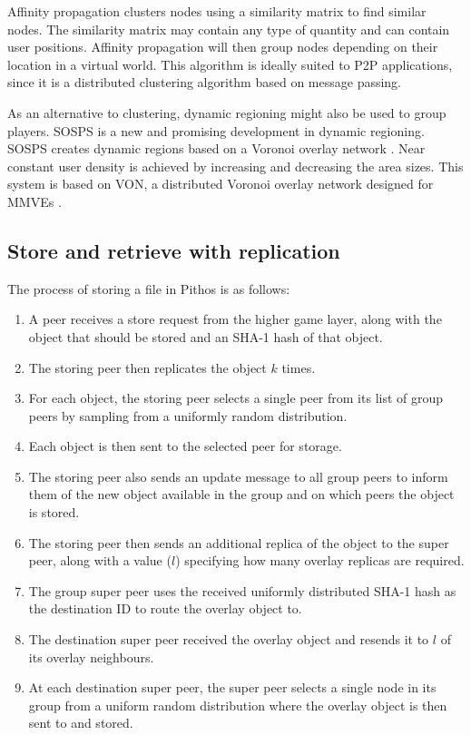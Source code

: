 \documentclass[10pt,a4paper,conference]{IEEEtran}
\begin{document}
Affinity propagation clusters nodes using a similarity matrix to find similar nodes. The similarity matrix may contain any type of quantity and can
contain user positions. Affinity propagation will then group nodes depending on their location in a virtual world. This algorithm is ideally suited
to P2P applications, since it is a distributed clustering algorithm based on message passing.

As an alternative to clustering, dynamic regioning might also be used to group players. SOSPS is a new and promising development in dynamic
regioning. SOSPS creates dynamic regions based on a Voronoi overlay network \cite{voronoi_diagrams_survey}. Near constant user density is achieved by
increasing and decreasing the area sizes. This system is based on VON, a distributed Voronoi overlay network designed for MMVEs \cite{VON_VAST}.

\subsection{Store and retrieve with replication}
\label{store_retrieve}

The process of storing a file in Pithos is as follows:
\begin{enumerate}
\item A peer receives a store request from the higher game layer, along with the object that should be stored and an SHA-1 hash of that object.
\item The storing peer then replicates the object $k$ times.
\item For each object, the storing peer selects a single peer from its list of group peers by sampling from a uniformly random distribution.
\item Each object is then sent to the selected peer for storage.
\item The storing peer also sends an update message to all group peers to inform them of the new object available in the group and on which peers
    the object is stored.
\item The storing peer then sends an additional replica of the object to the super peer, along with a value ($l$) specifying how many overlay
    replicas are required.
\item The group super peer uses the received uniformly distributed SHA-1 hash as the destination ID to route the overlay object to.
\item The destination super peer received the overlay object and resends it to $l$ of its overlay neighbours.
\item At each destination super peer, the super peer selects a single node in its group from a uniform random distribution where the overlay
    object is then sent to and stored.
\end{enumerate}
\end{document}
